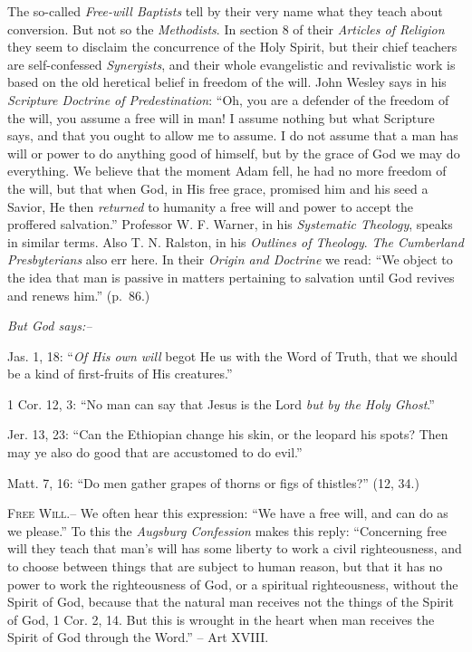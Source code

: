 \documentclass[
]{book}
\begin{document}
The so-called \emph{Free-will Baptists} tell by their very name what they teach about conversion. But not so the \emph{Methodists}. In section 8 of their \emph{Articles of Religion} they seem to disclaim the concurrence of the Holy Spirit, but their chief teachers are self-confessed \emph{Synergists}, and their whole evangelistic and revivalistic work is based on the old heretical belief in freedom of the will. John Wesley says in his \emph{Scripture Doctrine of Predestination}: ``Oh, you are a defender of the freedom of the will, you assume a free will in man! I assume nothing but what Scripture says, and that you ought to allow me to assume. I do not assume that a man has will or power to do anything good of himself, but by the grace of God we may do everything. We believe that the moment Adam fell, he had no more freedom of the will, but that when God, in His free grace, promised him and his seed a Savior, He then \emph{returned} to humanity a free will and power to accept the proffered salvation.'' Professor W. F. Warner, in his \emph{Systematic Theology}, speaks in similar terms. Also T. N. Ralston, in his \emph{Outlines of Theology}. \emph{The Cumberland Presbyterians} also err here. In their \emph{Origin and Doctrine} we read: ``We object to the idea that man is passive in matters pertaining to salvation until God revives and renews him.'' (p.~86.)

\begin{center}
\textsl{But God says:--}
\end{center}

Jas. 1, 18: ``\emph{Of His own will} begot He us with the Word of Truth, that we should be a kind of first-fruits of His creatures.''

1 Cor. 12, 3: ``No man can say that Jesus is the Lord \emph{but by the Holy Ghost}.''

Jer. 13, 23: ``Can the Ethiopian change his skin, or the leopard his spots? Then may ye also do good that are accustomed to do evil.''

Matt. 7, 16: ``Do men gather grapes of thorns or figs of thistles?'' (12, 34.)

\textsc{Free Will.--} We often hear this expression: ``We have a free will, and can do as we please.'' To this the \emph{Augsburg Confession} makes this reply: ``Concerning free will they teach that man's will has some liberty to work a civil righteousness, and to choose between things that are subject to human reason, but that it has no power to work the righteousness of God, or a spiritual righteousness, without the Spirit of God, because that the natural man receives not the things of the Spirit of God, 1 Cor. 2, 14. But this is wrought in the heart when man receives the Spirit of God through the Word.'' -- Art XVIII.
\end{document}
